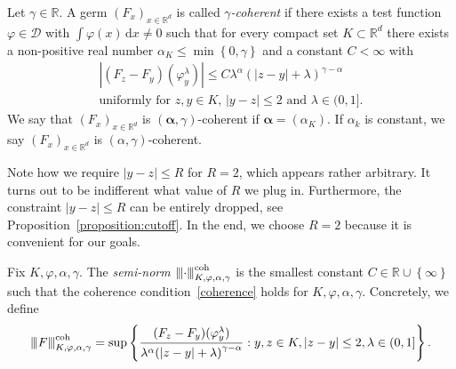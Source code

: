 \begin{definition}\label{definition:coherence}
   Let \(\gamma \in \mathbb{R}\). A germ \({(F_x)}_{x \in \mathbb{R}^d}\) is called \emph{\(\gamma\)-coherent} if there exists a test function \(\varphi \in \mathcal{D}\) with \(\int \varphi(x) \, \mathrm{d}x \neq 0\) such that for every compact set \(K \subset \mathbb{R}^d\) there exists a non-positive real number \(\alpha_K \leq \min\left\{ 0, \gamma \right\}\) and a constant \(C < \infty\) with
   \begin{gather}\label{coherence}
        |(F_z - F_y)(\varphi^\lambda_y)| \leq C\lambda^\alpha{(|z-y| + \lambda)}^{\gamma - \alpha}  \\ \text{uniformly for \(z,y \in K\), \(|y-z| \leq 2\)  and \(\lambda \in (0,1]\)} \nonumber. %
   \end{gather}
   We say that  \({(F_x)}_{x \in \mathbb{R}^d}\) is \((\bm{\alpha}, \gamma)\)-coherent if \(\bm \alpha = (\alpha_K)\). If \( \alpha_k \) is constant, we say \({(F_x)}_{x \in \mathbb{R}^d}\) is \(({\alpha}, \gamma)\)-coherent.
\end{definition}
\begin{remark}\label{remark:cutoff}
    Note how we require \(|y-z| \leq R\) for \( R = 2 \), which appears rather arbitrary. It turns out to be indifferent what value of \( R \) we plug in. Furthermore, the constraint \(|y-z| \leq R\) can be entirely dropped, see Proposition~\ref{proposition:cutoff}. In the end, we choose \(R = 2\) because it is convenient for our goals.
\end{remark}

Fix \(K, \varphi, \alpha, \gamma\). The \emph{semi-norm \({\left\vert\kern-0.25ex\left\vert\kern-0.25ex\left\vert\cdot \right\vert\kern-0.25ex\right\vert\kern-0.25ex\right\vert}^{\mathrm{coh}}_{K,\varphi,\alpha,\gamma}\)} is the smallest constant \(C \in \mathbb{R} \cup \left\{ \infty \right\}\) such that the coherence condition~\eqref{coherence} holds for \(K, \varphi, \alpha, \gamma\). Concretely, we define
\begin{align*}
    \vertiii{F}^{\mathrm{coh}}_{K,\varphi,\alpha,\gamma} = \sup \left\{ \frac{(F_z - F_y)(\varphi^\lambda_y)}{\lambda^\alpha{(|z-y| + \lambda)}^{\gamma - \alpha}} : y,z \in K, |z-y| \leq 2, \lambda \in (0,1] \right\}. %
\end{align*}

